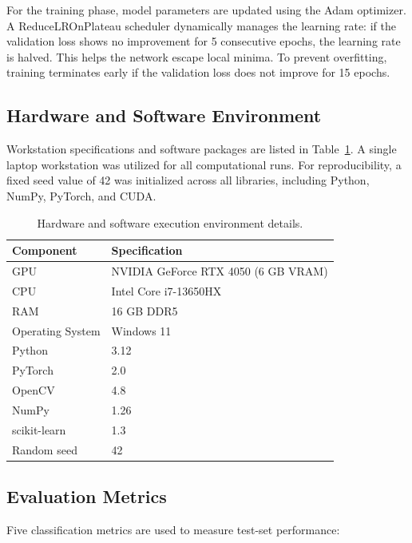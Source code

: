 For the training phase, model parameters are updated using the Adam optimizer. A ReduceLROnPlateau scheduler dynamically manages the learning rate: if the validation loss shows no improvement for 5 consecutive epochs, the learning rate is halved. This helps the network escape local minima. To prevent overfitting, training terminates early if the validation loss does not improve for 15 epochs.

\subsection{Hardware and Software Environment}

Workstation specifications and software packages are listed in Table~\ref{tab:hardware}. A single laptop workstation was utilized for all computational runs. For reproducibility, a fixed seed value of 42 was initialized across all libraries, including Python, NumPy, PyTorch, and CUDA.

\begin{table}[H]
\centering
\caption{Hardware and software execution environment details.}
\label{tab:hardware}
\footnotesize
\setlength{\tabcolsep}{4pt}
\begin{tabular}{p{2.8cm}p{4.9cm}}
\toprule
\textbf{Component} & \textbf{Specification} \\
\midrule
GPU & NVIDIA GeForce RTX 4050 (6 GB VRAM) \\
CPU & Intel Core i7-13650HX \\
RAM & 16 GB DDR5 \\
Operating System & Windows 11 \\
Python & 3.12 \\
PyTorch & 2.0 \\
OpenCV & 4.8 \\
NumPy & 1.26 \\
scikit-learn & 1.3 \\
Random seed & 42 \\
\bottomrule
\end{tabular}
\end{table}

\subsection{Evaluation Metrics}

Five classification metrics are used to measure test-set performance:

